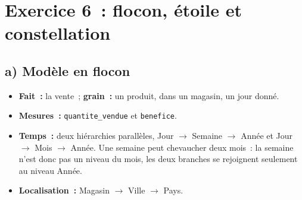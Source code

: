 \newpage
\section*{Exercice 6~: flocon, étoile et constellation}

\subsection*{a) Modèle en flocon}
{}

\begin{itemize}
	\item \textbf{Fait~:} la vente~; \textbf{grain~:} un produit, dans un magasin, un jour donné.
	\item \textbf{Mesures~:} \texttt{quantite\_vendue} et \texttt{benefice}.
	\item \textbf{Temps~:} deux hiérarchies parallèles, Jour $\rightarrow$ Semaine $\rightarrow$ Année et Jour $\rightarrow$ Mois $\rightarrow$ Année. Une semaine peut chevaucher deux mois~: la semaine n'est donc pas un niveau du mois, les deux branches se rejoignent seulement au niveau Année.
	\item \textbf{Localisation~:} Magasin $\rightarrow$ Ville $\rightarrow$ Pays.
\end{itemize}

